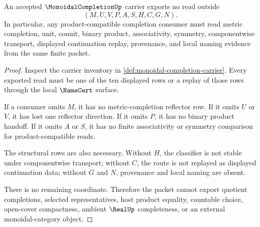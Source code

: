 \begin{theorem}
\label{thm:monoidal-completion-nonescape}
An accepted $\MonoidalCompletionUp$ carrier exports no read outside
$$
(M,U,V,P,A,S,H,C,G,N).
$$
In particular, any product-compatible completion consumer must read metric completion, unit, counit, binary product, associativity, symmetry, componentwise transport, displayed continuation replay, provenance, and local naming evidence from the same finite packet.
\end{theorem}
\begin{proof}
Inspect the carrier inventory in \autoref{def:monoidal-completion-carrier}. Every exported read must be one of the ten displayed rows or a replay of those rows through the local $\NameCert$ surface.

If a consumer omits $M$, it has no metric-completion reflector row. If it omits $U$ or $V$, it has lost one reflector direction. If it omits $P$, it has no binary product handoff. If it omits $A$ or $S$, it has no finite associativity or symmetry comparison for product-compatible reads.

The structural rows are also necessary. Without $H$, the classifier is not stable under componentwise transport; without $C$, the route is not replayed as displayed continuation data; without $G$ and $N$, provenance and local naming are absent.

There is no remaining coordinate. Therefore the packet cannot export quotient completions, selected representatives, host product equality, countable choice, open-cover compactness, ambient $\RealUp$ completeness, or an external monoidal-category object.
\end{proof}


\begin{closurestatus}{\MonoidalCompletionUp}
  \theoryclosure{\seedClosure}
  \formalstatus{\unformalizedV}
\end{closurestatus}
